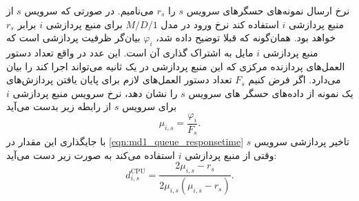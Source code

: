     نرخ ارسال نمونه‌های حسگر‌های سرویس $s$ را $r_s$ می‌نامیم.
    در صورتی که سرویس $s$ از منبع پردازشی $i$ استفاده کند نرخ ورود در مدل $M/D/1$ برای منبع پردازشی $i$ برابر $r_s$ خواهد بود.
    همان‌گونه که قبلا توضیح داده شد، $\varphi_i$ بیان‌گر ظرفیت پردازشی است که منبع پردازشی $i$ مایل به اشتراک گذاری آن است.
    این عدد در واقع تعداد دستور العمل‌های پردازنده مرکزی که این منبع پردازشی در یک ثانیه می‌تواند اجرا کند را بیان می‌دارد.
    اگر فرض کنیم $F_s$ تعداد دستور العمل‌های لازم برای پایان یافتن پردازش‌های یک نمونه از داده‌های حسگر های سرویس‌ $s$ را نشان دهد، نرخ سرویس منبع پردازشی $i$ برای سرویس $s$ از رابطه زیر بدست می‌آید
    \begin{equation}
      \mu_{i,s} = \frac{\varphi_i}{F_s}.
    \end{equation}
    با جایگذاری این مقدار در \cref{eqn:md1_queue_responsetime} تاخیر پردازشی سرویس $s$ وقتی از منبع پردازشی $i$ استفاده می‌کند به صورت زیر دست می‌آید:
    \begin{equation}
      d_{i,s}^{\text{CPU}} = \frac{2\mu_{i,s}-r_s}{2\mu_{i,s}(\mu_{i,s}-r_s)}.
    \end{equation}

